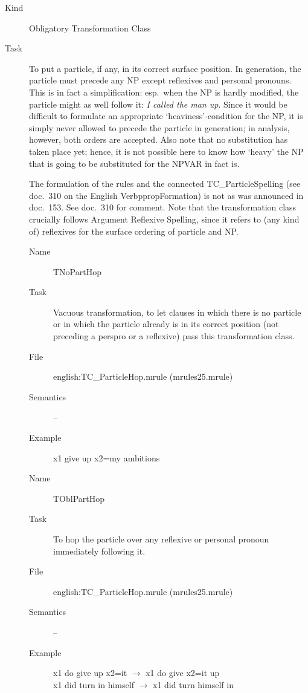 \begin{description}
\item[Kind] Obligatory Transformation Class
\item[Task] To put a particle, if any, in its correct surface position.
In generation, the particle must precede any NP except reflexives and personal 
pronouns. This is in fact a simplification: esp.\ when the NP is hardly
modified, the particle might as well follow it: {\em I called the man up\/}. 
Since it would be difficult to formulate an appropriate `heaviness'-condition 
for the NP, it is simply never allowed to precede the particle in generation;
in analysis, however, both orders are accepted. Also note that no substitution 
has taken place yet; hence, it is not possible here to know how `heavy' the NP 
that is going to be substituted for the NPVAR in fact is.

The formulation of the rules and the connected TC\_ParticleSpelling (see doc.\ 
310 on the English VerbppropFormation) is not as was announced in 
doc.\ 153. See doc.\ 310 for comment. Note that 
the transformation class crucially follows Argument Reflexive Spelling, since 
it refers to (any kind of) reflexives for the surface ordering of particle and 
NP.

\vspace{1 cm}
\begin{description}
\item[Name] TNoPartHop
\item[Task] Vacuous transformation, to let clauses in which there is no 
particle or in which the
particle already is in its correct position (not preceding a perspro 
or a reflexive) pass this transformation class.
\item[File] english:TC\_ParticleHop.mrule (mrules25.mrule)
\item[Semantics] -- 
\item[Example] x1 give up x2=my ambitions
\end{description}

\vspace{1 cm}
\begin{description}
\item[Name] TOblPartHop
\item[Task] To hop the particle over any reflexive or personal pronoun 
immediately following it.
\item[File] english:TC\_ParticleHop.mrule (mrules25.mrule)
\item[Semantics] -- 
\item[Example] x1 do give up x2=it $\rightarrow$ x1 do give x2=it up\\
x1 did turn in himself $\rightarrow$ x1 did turn himself in
\end{description}


\end{description}
